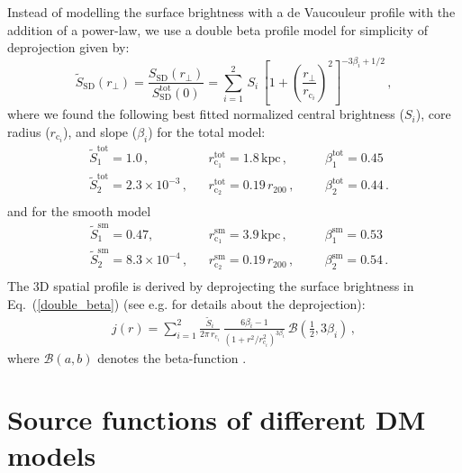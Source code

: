 \documentclass[10pt,aps,pra,reprint,amsmath,amsfonts,amssymb,showpacs]{revtex4-1}
\newcommand{\rmn}{\mathrm}
\newcommand{\sd}{\rmn{SD}}
\newcommand{\rvir}{r_{200}}
\begin{document}
Instead of modelling the surface brightness with a de Vaucouleur
profile with the addition of a power-law, we use a double beta profile
model for simplicity of deprojection given by:
\begin{equation}
\tilde{S}_\sd (r_\bot) = \frac{S_\sd (r_\bot)}{S_\rmn{SD}^\rmn{tot}(0)} = 
\sum_{i=1}^2 \,S_i\, 
\left[1 + \left( \frac{r_\bot}{r_{\mathrm{c}_i}}\right)^2\right]
^{-3\beta_i + 1/2}\,,
\label{double_beta}
\end{equation}
where we found the following best fitted normalized central brightness
($S_i$), core radius ($r_{\mathrm{c}_i}$), and slope ($\beta_i$) for
the total model:
\begin{align}
&\tilde{S}_1^\rmn{tot} = 1.0\,,
&&r_{\mathrm{c}_1}^\rmn{tot} = 1.8\,\rmn{kpc}\,,
&&&\beta_1^\rmn{tot} = 0.45\, \nonumber\\
&\tilde{S}_2^\rmn{tot} = 2.3\times10^{-3}\,,
&&r_{\mathrm{c}_2}^\rmn{tot} = 0.19\,\rvir\,,
&&&\beta_2^\rmn{tot} = 0.44\,.\nonumber\\
& && &&&
\label{fit_spatial_IR}
\end{align}
and for the smooth model
\begin{align}
&\tilde{S}_1^\rmn{sm}=0.47,\,
&&r_{\mathrm{c}_1}^\rmn{sm}=3.9\,\rmn{kpc}\,,
&&&\beta_1^\rmn{sm}=0.53 \,\nonumber\\
&\tilde{S}_2^\rmn{sm}=8.3\times10^{-4}\,,
&&r_{\mathrm{c}_2}^\rmn{sm}=0.19\,\rvir\,,
&&&\beta_2^\rmn{sm}=0.54\,.\nonumber\\
& && &&&
\label{fit_spatial_IR}
\end{align}
The 3D spatial profile is derived by deprojecting the surface
brightness in Eq.~(\ref{double_beta}) (see
e.g. \cite{2004A&A...413...17P} for details about the deprojection):
\begin{eqnarray}
  j(r)  = \sum_{i=1}^2 \frac{\tilde{S}_i}{2\pi\,r_{\mathrm{c}_i}}\,
  \frac{6 \beta_i - 1}{\left(1 + r^2/r^2_{\mathrm{c}_i}\right)^{3\beta_i}}\,
  \mathcal{B}\left(\frac{1}{2},3\beta_i\right)\,,
\end{eqnarray}
where $\mathcal{B}(a,b)$ denotes the beta-function
\cite{1965hmfw.book.....A}.





\section{Source functions of different DM models}
\end{document}
